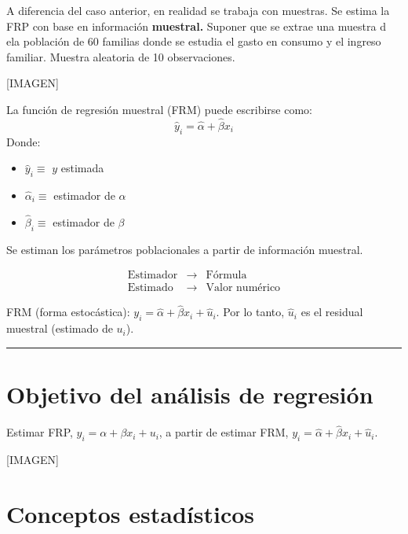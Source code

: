 \documentclass[
]{book}
\providecommand{\tightlist}{%
  \setlength{\itemsep}{0pt}\setlength{\parskip}{0pt}}
\begin{document}
A diferencia del caso anterior, en realidad se trabaja con muestras. Se estima la FRP con base en información \textbf{muestral.}
Suponer que se extrae una muestra d ela población de 60 familias donde se estudia el gasto en consumo y el ingreso familiar.
Muestra aleatoria de 10 observaciones.

{[}IMAGEN{]}

La función de regresión muestral (FRM) puede escribirse como:
\[
\hat y_i = \hat \alpha + \hat \beta x_i 
\]
Donde:

\begin{itemize}
\tightlist
\item
  \(\hat y_i \equiv\) \(y\) estimada
\item
  \(\hat \alpha_i \equiv\) estimador de \(\alpha\)
\item
  \(\hat \beta_i \equiv\) estimador de \(\beta\)
\end{itemize}

Se estiman los parámetros poblacionales a partir de información muestral.

\[
\begin{array}{ccc}
\text{Estimador} & \rightarrow & \text{Fórmula} \\
\text{Estimado} & \rightarrow & \text{Valor numérico}
\end{array}
\]

FRM (forma estocástica): \(y_i = \hat \alpha + \hat \beta x_i + \hat u_i\). Por lo tanto, \(\hat u_i\) es el residual muestral (estimado de \(u_i\)).

\begin{center}\rule{0.5\linewidth}{0.5pt}\end{center}

\hypertarget{objetivo-del-anuxe1lisis-de-regresiuxf3n}{%
\section{Objetivo del análisis de regresión}\label{objetivo-del-anuxe1lisis-de-regresiuxf3n}}

Estimar FRP, \(y_i = \alpha + \beta x_i + u_i\), a partir de estimar FRM, \(y_i = \hat \alpha + \hat \beta x_i + \hat u_i\).

{[}IMAGEN{]}

\hypertarget{conceptos-estaduxedsticos}{%
\section{Conceptos estadísticos}\label{conceptos-estaduxedsticos}}
\end{document}
